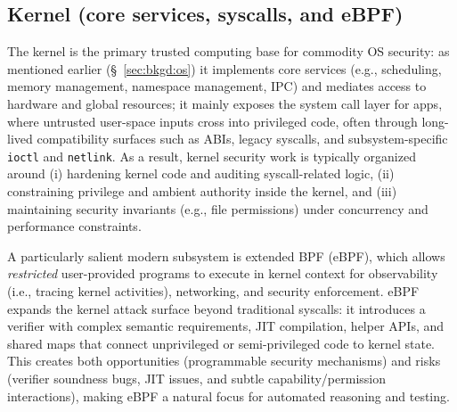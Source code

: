 \subsection{\textbf{Kernel (core services, syscalls, and eBPF)}}
\label{sec:os:kernel}
The kernel is the primary trusted computing base for commodity OS security: as mentioned earlier (\S~\ref{sec:bkgd:os}) it implements core services (e.g., scheduling, memory management, namespace management, IPC) and mediates access to hardware and global resources; 
it mainly exposes the system call layer for apps, where untrusted user-space inputs cross into privileged code, often through long-lived compatibility surfaces such as ABIs, legacy syscalls, and subsystem-specific \texttt{ioctl} and \texttt{netlink}. 
As a result, kernel security work is typically organized around (i) hardening kernel code and auditing syscall-related logic, (ii) constraining privilege and ambient authority inside the kernel, and (iii) maintaining security invariants (e.g., file permissions) under concurrency and performance constraints.

A particularly salient modern subsystem is extended BPF (eBPF), which allows \textit{restricted} user-provided programs to execute in kernel context for observability (i.e., tracing kernel activities), networking, and security enforcement. 
eBPF expands the kernel attack surface beyond traditional syscalls: it introduces a verifier with complex semantic requirements, JIT compilation, helper APIs, and shared maps that connect unprivileged or semi-privileged code to kernel state. 
This creates both opportunities (programmable security mechanisms) and risks (verifier soundness bugs, JIT issues, and subtle capability/permission interactions), making eBPF a natural focus for automated reasoning and testing.

